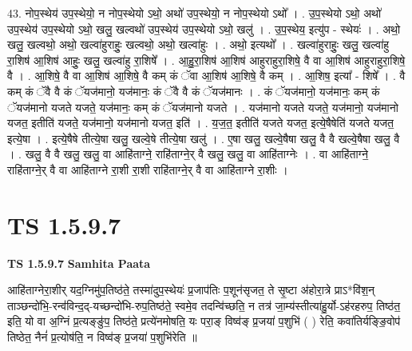 \documentclass[17pt]{extarticle}
\begin{document}
43. नोप॒स्थेय॑ उप॒स्थेयो॒ न नोप॒स्थेयो ऽथो॒ अथो॑ उप॒स्थेयो॒ न नोप॒स्थेयो ऽथो᳚ । . उ॒प॒स्थेयो ऽथो॒ अथो॑ उप॒स्थेय॑ उप॒स्थेयो ऽथो॒ खलु॒ खल्वथो॑ उप॒स्थेय॑ उप॒स्थेयो ऽथो॒ खलु॑ । . उ॒प॒स्थेय॒ इत्यु॑प - स्थेयः॑ । . अथो॒ खलु॒ खल्वथो॒ अथो॒ खल्वा॑हुराहुः॒ खल्वथो॒ अथो॒ खल्वा॑हुः । . अथो॒ इत्यथो᳚ । . खल्वा॑हुराहुः॒ खलु॒ खल्वा॑हु रा॒शिष॑ आ॒शिष॑ आहुः॒ खलु॒ खल्वा॑हु रा॒शिषे᳚ । . आ॒हु॒रा॒शिष॑ आ॒शिष॑ आहुराहुरा॒शिषे॒ वै वा आ॒शिष॑ आहुराहुरा॒शिषे॒ वै । . आ॒शिषे॒ वै वा आ॒शिष॑ आ॒शिषे॒ वै कम् कं ॅवा आ॒शिष॑ आ॒शिषे॒ वै कम् । . आ॒शिष॒ इत्या᳚ - शिषे᳚ । . वै कम् कं ॅवै वै कं ॅयज॑मानो॒ यज॑मानः॒ कं ॅवै वै कं ॅयज॑मानः । . कं ॅयज॑मानो॒ यज॑मानः॒ कम् कं ॅयज॑मानो यजते यजते॒ यज॑मानः॒ कम् कं ॅयज॑मानो यजते । . यज॑मानो यजते यजते॒ यज॑मानो॒ यज॑मानो यजत॒ इतीति॑ यजते॒ यज॑मानो॒ यज॑मानो यजत॒ इति॑ । . य॒ज॒त॒ इतीति॑ यजते यजत॒ इत्ये॒षैषेति॑ यजते यजत॒ इत्ये॒षा । . इत्ये॒षैषे तीत्ये॒षा खलु॒ खल्वे॒षे तीत्ये॒षा खलु॑ । . ए॒षा खलु॒ खल्वे॒षैषा खलु॒ वै वै खल्वे॒षैषा खलु॒ वै । . खलु॒ वै वै खलु॒ खलु॒ वा आहि॑ताग्ने॒ राहि॑ताग्ने॒र् वै खलु॒ खलु॒ वा आहि॑ताग्नेः । . वा आहि॑ताग्ने॒ राहि॑ताग्ने॒र् वै वा आहि॑ताग्ने रा॒शी रा॒शी राहि॑ताग्ने॒र् वै वा आहि॑ताग्ने रा॒शीः । \newline
\pagebreak
{}

\section{ TS 1.5.9.7 }

\textbf{TS 1.5.9.7 } \newline
\textbf{Samhita Paata} \newline

आहि॑ताग्नेरा॒शीर् यद॒ग्निमु॑प॒तिष्ठ॑ते॒ तस्मा॑दुप॒स्थेयः॑ प्र॒जाप॑तिः प॒शून॑सृजत॒ ते सृ॒ष्टा अ॑होरा॒त्रे प्राऽ*वि॑श॒न् ताञ्छन्दो॑भि॒-रन्व॑॑विन्द॒द्-यच्छन्दो॑भि-रुप॒तिष्ठ॑ते॒ स्वमे॒व तदन्वि॑च्छति॒ न तत्र॑ जा॒म्य॑स्तीत्या॑हु॒र्यो-ऽह॑रहरुप॒ तिष्ठ॑त॒ इति॒ यो वा अ॒ग्निं प्र॒त्यङ्ङु॑प॒ तिष्ठ॑ते॒ प्रत्ये॑नमोषति॒ यः परा॒ङ् विष्व॑ङ् प्र॒जया॑ प॒शुभि॑ ( ) रेति॒ कवा॑तिर्यङ्ङि॒वोप॑ तिष्ठेत॒ नैनं॑ प्र॒त्योष॑ति॒ न विष्व॑ङ् प्र॒जया॑ प॒शुभि॑रेति ॥ \newline
\end{document}
